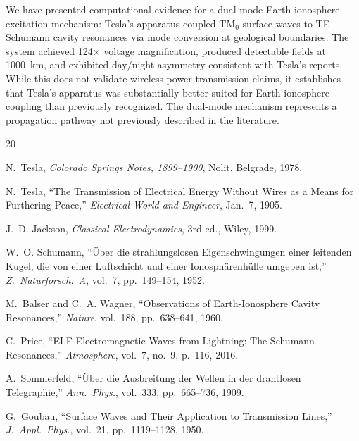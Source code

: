 \documentclass[12pt,a4paper]{article}
\begin{document}
We have presented computational evidence for a dual-mode Earth-ionosphere excitation mechanism: Tesla's apparatus coupled TM$_0$ surface waves to TE Schumann cavity resonances via mode conversion at geological boundaries. The system achieved 124$\times$ voltage magnification, produced detectable fields at 1000~km, and exhibited day/night asymmetry consistent with Tesla's reports. While this does not validate wireless power transmission claims, it establishes that Tesla's apparatus was substantially better suited for Earth-ionosphere coupling than previously recognized. The dual-mode mechanism represents a propagation pathway not previously described in the literature.



\begin{thebibliography}{20}

N.~Tesla, \emph{Colorado Springs Notes, 1899--1900}, Nolit, Belgrade, 1978.

N.~Tesla, ``The Transmission of Electrical Energy Without Wires as a Means for Furthering Peace,'' \emph{Electrical World and Engineer}, Jan.~7, 1905.

J.~D. Jackson, \emph{Classical Electrodynamics}, 3rd ed., Wiley, 1999.

W.~O. Schumann, ``{\"U}ber die strahlungslosen Eigenschwingungen einer leitenden Kugel, die von einer Luftschicht und einer Ionosph{\"a}renh{\"u}lle umgeben ist,'' \emph{Z.\ Naturforsch.\ A}, vol.~7, pp.~149--154, 1952.

M.~Balser and C.~A. Wagner, ``Observations of Earth-Ionosphere Cavity Resonances,'' \emph{Nature}, vol.~188, pp.~638--641, 1960.

C.~Price, ``ELF Electromagnetic Waves from Lightning: The Schumann Resonances,'' \emph{Atmosphere}, vol.~7, no.~9, p.~116, 2016.

A.~Sommerfeld, ``{\"U}ber die Ausbreitung der Wellen in der drahtlosen Telegraphie,'' \emph{Ann.\ Phys.}, vol.~333, pp.~665--736, 1909.

G.~Goubau, ``Surface Waves and Their Application to Transmission Lines,'' \emph{J.\ Appl.\ Phys.}, vol.~21, pp.~1119--1128, 1950.


\end{thebibliography}
\end{document}
